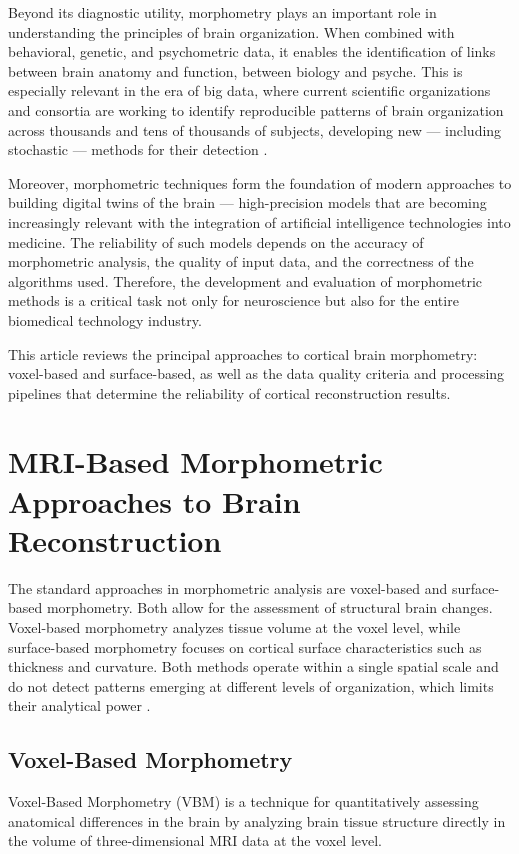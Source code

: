 \documentclass[default]{subfiles}
\begin{document}
Beyond its diagnostic utility, morphometry plays an important role in understanding the principles of brain
organization. When combined with behavioral, genetic, and psychometric data, it enables the identification of links
between brain anatomy and function, between biology and psyche. This is especially relevant in the era of big data,
where current scientific organizations and consortia are working to identify reproducible patterns of brain
organization across thousands and tens of thousands of subjects, developing new — including stochastic — methods for
their detection \cite{daoudi_2024, kurella_2023}.

Moreover, morphometric techniques form the foundation of modern approaches to building digital twins of the brain —
high-precision models that are becoming increasingly relevant with the integration of artificial intelligence
technologies into medicine. The reliability of such models depends on the accuracy of morphometric analysis, the
quality of input data, and the correctness of the algorithms used. Therefore, the development and evaluation of
morphometric methods is a critical task not only for neuroscience but also for the entire biomedical technology
industry.

This article reviews the principal approaches to cortical brain morphometry: voxel-based and surface-based, as well as
the data quality criteria and processing pipelines that determine the reliability of cortical reconstruction results.

\section{MRI-Based Morphometric Approaches to Brain Reconstruction}

The standard approaches in morphometric analysis are voxel-based and surface-based morphometry. Both allow for the
assessment of structural brain changes. Voxel-based morphometry analyzes tissue volume at the voxel level, while
surface-based morphometry focuses on cortical surface characteristics such as thickness and curvature. Both methods
operate within a single spatial scale and do not detect patterns emerging at different levels of organization, which
limits their analytical power \cite{cao_2023}.

\subsection{Voxel-Based Morphometry}
Voxel-Based Morphometry (VBM) is a technique for quantitatively assessing anatomical differences in the brain by
analyzing brain tissue structure directly in the volume of three-dimensional MRI data at the voxel level.
\end{document}
